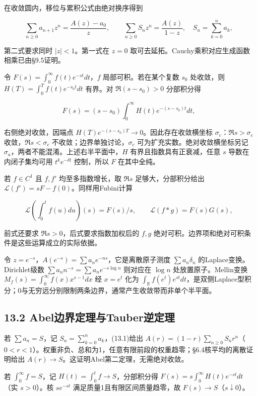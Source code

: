 \documentclass[11pt,a4paper]{article}
\begin{document}
在收敛圆内，移位与累积公式由绝对换序得到

\[
\sum_{n\ge0}a_{n+1}z^n=\frac{A(z)-a_0}{z},\qquad
\sum_{n\ge0}S_nz^n=\frac{A(z)}{1-z},\quad S_n=\sum_{k=0}^na_k,\tag{13.1}
\]

第二式要求同时 \(|z|<1\)。第一式在 \(z=0\)
取可去延拓。Cauchy乘积对应生成函数相乘已由§9.5证明。

令 \(F(s)=\int_0^\infty f(t)e^{-st}dt\)，\(f\) 局部可积。若在某个复数
\(s_0\) 处收敛，则 \(H(T)=\int_0^Tf(t)e^{-s_0t}dt\) 有界。对
\(\Re(s-s_0)>0\) 分部积分得

\[
F(s)=(s-s_0)\int_0^\infty H(t)e^{-(s-s_0)t}dt,
\]

右侧绝对收敛，因端点 \(H(T)e^{-(s-s_0)T}\to0\)。因此存在收敛横坐标
\(\sigma_c\)：\(\Re s>\sigma_c\) 收敛，\(\Re s<\sigma_c\)
不收敛；边界单独讨论，\(\sigma_c\) 可为扩充实数。绝对收敛横坐标另记
\(\sigma_a\)，两者不能混淆。上述右半平面中，\(H\)
有界且指数具有正衰减，任意 \(s\) 导数在内闭子集均可用
\(t^ke^{-\delta t}\) 控制，所以 \(F\) 在其中全纯。

若 \(f\in C^1\) 且 \(f,f'\) 均至多指数增长，取 \(\Re s\)
足够大，分部积分给出 \(\mathcal L(f')=sF-f(0)\)。同样用Fubini计算

\[
\mathcal L\left(\int_0^tf(u)du\right)(s)=F(s)/s,
\qquad \mathcal L(f*g)=F(s)G(s),\tag{13.2}
\]

前式还要求 \(\Re s>0\)，后式要求指数加权后的 \(f,g\)
绝对可积。边界项和绝对可积条件是这些运算成立的实际依据。

令 \(z=e^{-s}\)，\(A(e^{-s})=\sum a_ne^{-ns}\)，它是离散原子测度
\(\sum a_n\delta_n\) 的Laplace变换。Dirichlet级数
\(\sum a_nn^{-s}=\sum a_ne^{-s\log n}\) 则对应在 \(\log n\)
处放置原子。Mellin变换 \(M_f(s)=\int_0^\infty f(x)x^{s-1}dx\) 经
\(x=e^t\) 化为
\(\int_{\mathbb R}f(e^t)e^{st}dt\)，是双侧Laplace型积分；0与无穷远分别限制两条边界，通常产生收敛带而非单个半平面。

\subsection{13.2
Abel边界定理与Tauber逆定理}\label{abelux8fb9ux754cux5b9aux7406ux4e0etauberux9006ux5b9aux7406}

若 \(\sum a_n=S\)，记 \(S_n=\sum_{k=0}^na_k\)，(13.1)给出
\(A(r)=(1-r)\sum_{n\ge0}S_nr^n\)（\(0<r<1\)）。权重非负、总和为1，任意有限前段的权重趋零；§6.4核平均的离散证明给出
\(A(r)\to S\)。这证明Abel第二定理，无需绝对收敛。

若 \(\int_0^\infty f=S\)，记 \(H(t)=\int_0^tf\to S\)，分部积分得
\(F(s)=s\int_0^\infty H(t)e^{-st}dt\)（实 \(s>0\)）。核 \(se^{-st}\)
满足质量1且有限区间质量趋零，故 \(F(s)\to S\)（\(s\downarrow0\)）。
\end{document}
